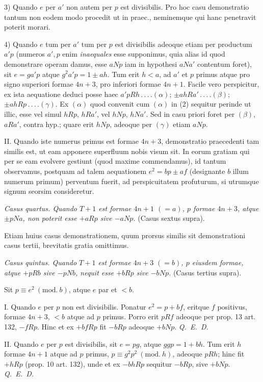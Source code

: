 3) Quando $e$ per $a'$ non autem per $p$ est divisibilis. Pro hoc casu demonstratio tantum non eodem modo procedit ut in praec., neminemque qui hanc penetravit poterit morari.

4) Quando $e$ tum per $a'$ tum per $p$ est divisibilis adeoque etiam per productum $a'p$ (numeros $a',p$ enim \textit{inaequales} esse supponimus, quia alias id quod demonstrare operam damus, esse $aNp$ iam in hypothesi $aNa'$ contentum foret), sit $e=ga'p$ atque $g^2a'p=1\pm ah$. Tum erit $h<a$, ad $a'$ et $p$ primus atque pro signo superiori formae $4n+3$, pro inferiori formae $4n+1$. Facile vero perspicitur, ex ista aequatione deduci posse haec $a'pRh\,.\,.\,.\,.(\alpha)$; $\pm ahRa'\,.\,.\,.\,.(\beta)$; $\pm ahRp\,.\,.\,.\,.(\gamma)$. Ex $(\alpha)$ quod convenit cum $(\alpha)$ in (2) sequitur perinde ut illic, esse vel simul $hRp$, $hRa'$, vel $hNp$, $hNa'$. Sed in casu priori foret per $(\beta)$, $aRa'$, contra hyp.; quare erit $hNp$, adeoque per $(\gamma)$ etiam $aNp$.

II. Quando iste numerus primus est formae $4n+3$, demonstratio praecedenti tam similis est, ut eam apponere superfluum nobis visum sit. In eorum gratiam qui per se eam evolvere gestiunt (quod maxime commendamus), id tantum observamus, postquam ad talem aequationem $e^2=bp\pm af$ (designante $b$ illum numerum primum) perventum fuerit, ad perspicuitatem profuturum, si utrumque signum seorsim consideretur.


\textit{Casus quartus. Quando $T+1$ est formae $4n+1$ $(=a)$, $p$ formae $4n+3$, atque $\pm pNa$, non poterit esse $+aRp$ sive $-aNp$.} (Casus sextus supra).

Etiam huius casus demonstrationem, quum prorsus similis sit demonstrationi casus tertii, brevitatis gratia omittimus.


\textit{Casus quintus. Quando $T+1$ est formae $4n+3$ $(=b)$, $p$ eiusdem formae, atque $+pRb$ sive $-pNb$, nequit esse $+bRp$ sive $-bNp$.} (Casus tertius supra).

Sit $p\equiv e^2\ (\mathrm{mod.}\ b)$, atque $e$ par et $<b$.

I. Quando $e$ per $p$ non est divisibilis. Ponatur $e^2=p+bf$, eritque $f$ positivus, formae $4n+3$, $<b$ atque ad $p$ primus. Porro erit $pRf$ adeoque per prop. 13 art. 132, $-fRp$. Hinc et ex $+bfRp$ fit $-bRp$ adeoque $+bNp$. \textit{Q.~E.~D.}

II. Quando $e$ per $p$ est divisibilis, sit $e=pg$, atque $ggp=1+bh$. Tum erit $h$ formae $4n+1$ atque ad $p$ primus, $p\equiv g^2p^2\ (\mathrm{mod.}\ h)$, adeoque $pRh$; hinc fit $+hRp$ (prop. 10 art. 132), unde et ex $-bhRp$ sequitur $-bRp$, sive $+bNp$. \textit{Q.~E.~D.}

